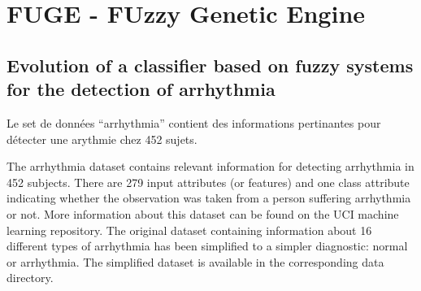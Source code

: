 \chapter*{FUGE - FUzzy Genetic Engine}
\section*{Evolution of a classifier based on fuzzy systems for the detection of arrhythmia}

Le set de données ``arrhythmia'' contient des informations pertinantes pour détecter une arythmie chez 452 sujets.

The arrhythmia dataset contains relevant information for detecting arrhythmia in 452 subjects. There are 279 input attributes (or features) and one class attribute indicating whether the observation was taken from a person suffering arrhythmia or not. More information about this dataset can be found on the UCI machine learning repository. The original dataset containing information about 16 different types of arrhythmia has been simplified to a simpler diagnostic: normal or arrhythmia. The simplified dataset is available in the corresponding data directory. 



